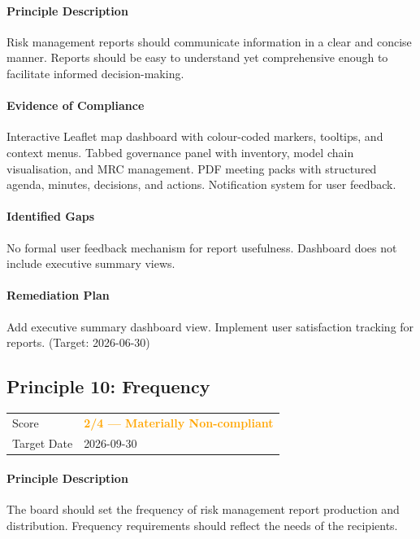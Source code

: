 \documentclass[11pt]{article}
\begin{document}
\paragraph{Principle Description}
Risk management reports should communicate information in a clear and concise manner. Reports should be easy to understand yet comprehensive enough to facilitate informed decision-making.

\paragraph{Evidence of Compliance}
Interactive Leaflet map dashboard with colour-coded markers, tooltips, and context menus. Tabbed governance panel with inventory, model chain visualisation, and MRC management. PDF meeting packs with structured agenda, minutes, decisions, and actions. Notification system for user feedback.

\paragraph{Identified Gaps}
No formal user feedback mechanism for report usefulness. Dashboard does not include executive summary views.

\paragraph{Remediation Plan}
Add executive summary dashboard view. Implement user satisfaction tracking for reports. (Target: 2026-06-30)

\subsection{Principle 10: Frequency}

\begin{table}[H]
    \centering
    \begin{tabular}{ll}
        \toprule
        Score & \textcolor{orange}{\textbf{2/4 --- Materially Non-compliant}} \\
        Target Date & 2026-09-30 \\
        \bottomrule
    \end{tabular}
\end{table}

\paragraph{Principle Description}
The board should set the frequency of risk management report production and distribution. Frequency requirements should reflect the needs of the recipients.
\end{document}
